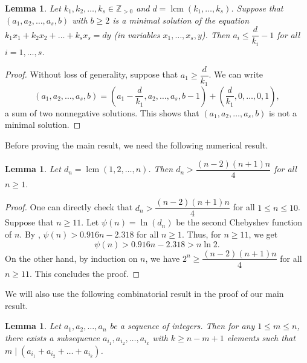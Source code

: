 \documentclass[12pt]{amsart}
\numberwithin{equation}{section}
\newtheorem{lemma}[theorem]{Lemma}
\theoremstyle{definition}
\DeclareMathOperator{\lcm}{lcm}
\newcommand{\ZZ}{{\mathbb Z}}
\begin{document}
\begin{lemma}
    \label{lem.xi<n}
    Let $k_1,k_2,\ldots,k_s \in \ZZ_{>0}$ and $d=\lcm(k_1,\ldots ,k_s)$. Suppose that $(a_1,a_2,\ldots ,a_s, b)$ with $b\ge 2$ is a minimal solution of the equation $k_1x_1+k_2x_2+\ldots +k_sx_s = dy$ (in variables $x_1,\ldots,x_s,y$). Then $a_i\le \dfrac{d}{k_i}-1$ for all $i=1,\ldots ,s$. 
\end{lemma}

\begin{proof}
    Without loss of generality, suppose that $a_1 \ge \dfrac{d}{k_1}$. We can write
    \[
    (a_1,a_2,\ldots ,a_s, b) = (a_1-\dfrac{d}{k_1},a_2,\ldots ,a_s, b-1) + (\dfrac{d}{k_1},0,\ldots ,0, 1), 
    \]
    a sum of two nonnegative solutions. This shows that $(a_1,a_2,\ldots ,a_s, b)$ is not a minimal solution.
\end{proof}

Before proving the main result, we need the following numerical result.

\begin{lemma}
    \label{lem.combIneq}
    Let $d_n=\lcm(1,2,\ldots , n)$. Then $d_n >\dfrac{(n-2)(n+1)n}{4}$ for all $n\ge 1$.
\end{lemma}

\begin{proof}
    One can directly check that $d_n >\dfrac{(n-2)(n+1)n}{4}$ for all $1\le n \le 10$. Suppose that $n\ge 11$. Let $\psi(n)= \ln(d_n)$ be the second Chebyshev function of $n$. By \cite[Lemma 2]{Nagura}, $\psi(n)>0.916n-2.318$ for all $n\ge 1$. Thus, for $n\ge 11$, we get $$\psi(n)>0.916n-2.318>n\ln 2.$$
    On the other hand, by induction on $n$, we have $2^n \ge \dfrac{(n-2)(n+1)n}{4}$ for all $n\ge 11$. This concludes the proof.
\end{proof}

We will also use the following combinatorial result in the proof of our main result.

\begin{lemma}
    \label{pigeonhole}
    Let $a_1,a_2,\ldots ,a_n$ be a sequence of integers. Then for any $1\le m \le n$, there exists a subsequence $a_{i_1},a_{i_2},\ldots ,a_{i_k}$ with $k\ge n-m+1$ elements such that $m \mid (a_{i_1}+a_{i_2}+\ldots +a_{i_k})$.
\end{lemma}
\end{document}
